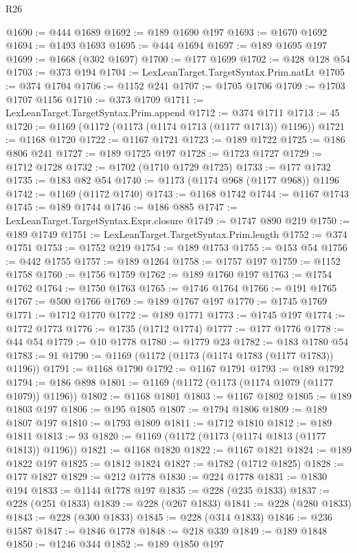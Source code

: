 \begin{lexlean}{R26}
\begin{coremodule}
@1690 := @444 @1689
@1692 := @189 @1690 @197
@1693 := @1670 @1692
@1694 := @1493 @1693
@1695 := @444 @1694
@1697 := @189 @1695 @197
@1699 := @1668 (@302 @1697)
@1700 := @177 @1699
@1702 := @428 @128 @54
@1703 := @373 @194
@1704 := LexLeanTarget.TargetSyntax.Prim.natLt
@1705 := @374 @1704
@1706 := @1152 @241
@1707 := @1705 @1706
@1709 := @1703 @1707 @1156
@1710 := @373 @1709
@1711 := LexLeanTarget.TargetSyntax.Prim.append
@1712 := @374 @1711
@1713 := 45
@1720 := @1169 (@1172 (@1173 (@1174 @1713 (@1177 @1713)) @1196))
@1721 := @1168 @1720
@1722 := @1167 @1721
@1723 := @189 @1722
@1725 := @186 @806 @241
@1727 := @189 @1725 @197
@1728 := @1723 @1727
@1729 := @1712 @1728
@1732 := @1702 (@1710 @1729 @1725)
@1733 := @177 @1732
@1735 := @183 @82 @54
@1740 := @1173 (@1174 @968 (@1177 @968)) @1196
@1742 := @1169 (@1172 @1740)
@1743 := @1168 @1742
@1744 := @1167 @1743
@1745 := @189 @1744
@1746 := @186 @885
@1747 := LexLeanTarget.TargetSyntax.Expr.closure
@1749 := @1747 @890 @219
@1750 := @189 @1749
@1751 := LexLeanTarget.TargetSyntax.Prim.length
@1752 := @374 @1751
@1753 := @1752 @219
@1754 := @189 @1753
@1755 := @153 @54
@1756 := @442 @1755
@1757 := @189 @1264
@1758 := @1757 @197
@1759 := @1152 @1758
@1760 := @1756 @1759
@1762 := @189 @1760 @197
@1763 := @1754 @1762
@1764 := @1750 @1763
@1765 := @1746 @1764
@1766 := @191 @1765
@1767 := @500 @1766
@1769 := @189 @1767 @197
@1770 := @1745 @1769
@1771 := @1712 @1770
@1772 := @189 @1771
@1773 := @1745 @197
@1774 := @1772 @1773
@1776 := @1735 (@1712 @1774)
@1777 := @177 @1776
@1778 := @44 @54
@1779 := @10 @1778
@1780 := @1779 @23
@1782 := @183 @1780 @54
@1783 := 91
@1790 := @1169 (@1172 (@1173 (@1174 @1783 (@1177 @1783)) @1196))
@1791 := @1168 @1790
@1792 := @1167 @1791
@1793 := @189 @1792
@1794 := @186 @898
@1801 := @1169 (@1172 (@1173 (@1174 @1079 (@1177 @1079)) @1196))
@1802 := @1168 @1801
@1803 := @1167 @1802
@1805 := @189 @1803 @197
@1806 := @195 @1805
@1807 := @1794 @1806
@1809 := @189 @1807 @197
@1810 := @1793 @1809
@1811 := @1712 @1810
@1812 := @189 @1811
@1813 := 93
@1820 := @1169 (@1172 (@1173 (@1174 @1813 (@1177 @1813)) @1196))
@1821 := @1168 @1820
@1822 := @1167 @1821
@1824 := @189 @1822 @197
@1825 := @1812 @1824
@1827 := @1782 (@1712 @1825)
@1828 := @177 @1827
@1829 := @212 @1778
@1830 := @224 @1778
@1831 := @1830 @194
@1833 := @1144 @1778 @197
@1835 := @228 (@235 @1833)
@1837 := @228 (@251 @1833)
@1839 := @228 (@267 @1833)
@1841 := @228 (@280 @1833)
@1843 := @228 (@300 @1833)
@1845 := @228 (@314 @1833)
@1846 := @236 @1587
@1847 := @1846 @1778
@1848 := @218 @339
@1849 := @189 @1848
@1850 := @1246 @344
@1852 := @189 @1850 @197

\end{coremodule}
\end{lexlean}
